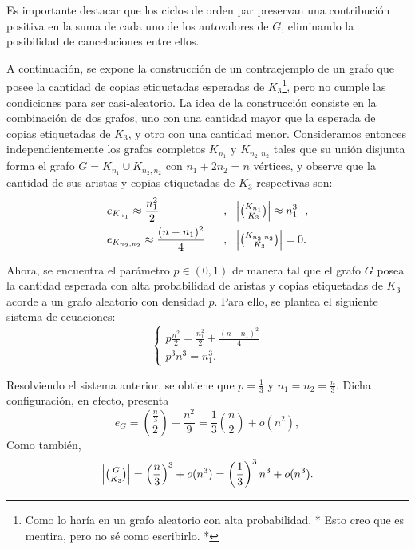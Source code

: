 \documentclass{article}[14pts]
\newcommand{\hh}[1]{{\color{red} * #1 *}}
\begin{document}
Es importante destacar que los ciclos de orden par preservan una contribución positiva en la suma de cada uno de los autovalores de $G$, eliminando la posibilidad de cancelaciones entre ellos.\medskip

A continuación, se expone la construcción de un contraejemplo de un grafo que posee la cantidad de copias etiquetadas esperadas de $K_3$\footnote{Como lo haría en un grafo aleatorio con alta probabilidad. \hh{Esto creo que es mentira, pero no sé como escribirlo.}}, pero no cumple las condiciones para ser casi-aleatorio. La idea de la construcción consiste en la combinación de dos grafos, uno con una cantidad mayor que la esperada de copias etiquetadas de $K_3$, y otro con una cantidad menor. Consideramos entonces independientemente los grafos completos $K_{n_1}$ y $K_{n_2, n_2}$ tales que su unión disjunta forma el grafo $G = K_{n_1}\cup K_{n_2, n_2}$ con $n_1 + 2n_2 = n$ vértices, y observe que la cantidad de sus aristas y copias etiquetadas de $K_3$ respectivas son:\medskip
\begin{equation*}
    \begin{aligned}
        &e_{K_{n_1}} \approx \frac{n_{1}^{2}}{2} &\ \  , &\ \ \left| \tbinom{K_{n_1}}{K_3}\right| \approx n_{1}^{3}\ \ , \\
        &e_{K_{n_2, n_2}} \approx \frac{(n-n_1)^{2}}{4} &\ \  , &\ \ \left| \tbinom{K_{n_2, n_2}}{K_3}\right| = 0.
    \end{aligned}
\end{equation*}\medskip

Ahora, se encuentra el parámetro $p\in(0,1)$ de manera tal que el grafo $G$ posea la cantidad esperada con alta probabilidad de aristas y copias etiquetadas de $K_3$ acorde a un grafo aleatorio con densidad $p$. Para ello, se plantea el siguiente sistema de ecuaciones:\medskip
\begin{equation*}
    \begin{cases}
        p\frac{n^{2}}{2} = \frac{n_{1}^{2}}{2} + \frac{(n-n_1)^{2}}{4}\\
        p^{3}n^{3} = n_{1}^{3}.
    \end{cases}
\end{equation*}\medskip

Resolviendo el sistema anterior, se obtiene que $p=\frac{1}{3}$ y $n_1 = n_2 = \frac{n}{3}$. Dicha configuración, en efecto, presenta
\begin{equation*}
    e_G = \binom{\frac{n}{3}}{2} + \frac{n^{2}}{9} = \frac{1}{3}\binom{n}{2} + o(n^{2}),
\end{equation*}
Como también,
\begin{equation*}
    \left| \tbinom{G}{K_3}\right| = \left(\frac{n}{3}\right)^{3} + o(n^{3}) = \left(\frac{1}{3}\right)^{3}n^{3} + o(n^{3}).
\end{equation*}\medskip
\end{document}
